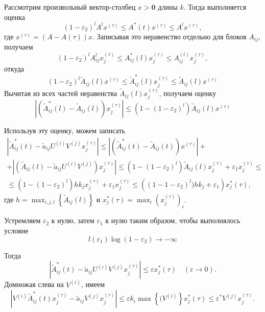\documentclass[12pt]{article}
\renewcommand{\leq}{\leqslant}
\renewcommand{\epsilon}{\varepsilon}
\begin{document}
{Рассмотрим произвольный вектор-столбец $x > \mathbf{0}$ длины $k$. Тогда выполняется оценка
\begin{equation}
	(1 - \epsilon_2)^l A^l x^{(\tau)} \leq A^*(t) x^{(\tau)} \leq A^l x^{(\tau)},
\end{equation}
где $x^{(\tau)} = (A - A(\tau)) x$. Записывая это неравенство отдельно для блоков $A_{ij}$, получаем
\begin{equation}
	(1 - \epsilon_2)^l A_{ij}^l x^{(\tau)}_j \leq A^*_{ij}(l) x^{(\tau)}_j \leq A^{(l)}_{ij} x^{(\tau)}_j,
\end{equation}
откуда
\begin{equation}
	(1 - \epsilon_2)^l \tilde{A}_{ij}(l) x^{(\tau)} \leq \tilde{A}^*_{ij}(l) x^{(\tau)}_j \leq \tilde{A}_{ij}(l) x^{(\tau)}
\end{equation}
Вычитая из всех частей неравенства $\tilde{A}_{ij}(l) x^{(\tau)}_j$, получаем оценку
\begin{equation}
	\left| \left( \tilde{A}^*_{ij}(l) - \tilde{A}_{ij}(l) \right) x^{(\tau)}_j \right| \leq (1 - (1 - \epsilon_2)^l) \tilde{A}_{ij}(l) x^{(\tau)}
\end{equation}

Используя эту оценку, можем записать
\begin{multline}
	\left| \tilde{A}^*_{ij}(t) - \tilde{a}_{ij} U^{(i)} V^{(j)} x^{(\tau)}_j \right| \leq \left| \left( \tilde{A}^*_{ij}(t) - \tilde{A}_{ij}(t) \right) x^{(\tau)} \right| + \\
	+ \left| \left( \tilde{A}_{ij}(l) - \tilde{a}_{ij} U^{(i)} V^{(j)} \right) x^{(\tau)}_j \right| \leq (1 - (1 - \epsilon_2)^l) \tilde{A}_{ij}(l) x^{(\tau)}_j + \epsilon_1 x^{(\tau)}_j \leq \\
	\leq (1 - (1 - \epsilon_2)^l) h k_j x^{(\tau)}_j + \epsilon_1 x^{(\tau)}_j \leq \left( (1 - 1 - \epsilon_2)^l) h k_j + \epsilon_1 \right) x^*_j(\tau),
\end{multline}
где $h = \max_{i,j,l} \left\{ \tilde{A}_{ij}(l) \right\}$ и $x^*_j(\tau) = \max_i (x^{(\tau)}_j)_i$.

Устремляем $\epsilon_2$ к нулю, затем $\epsilon_1$ к нулю таким образом, чтобы выполнялось условие
\begin{equation}
	l(\epsilon_1) \log(1 - \epsilon_2) \rightarrow -\infty
\end{equation}

Тогда 
\begin{equation}
	\left| \tilde{A}^*_{ij}(t) - \tilde{a}_{ij} U^{(i)} V^{(j)} x^{(\tau)}_j \right| \leq \epsilon x^*_j(\tau)\quad (\epsilon \rightarrow 0).
\end{equation}
Домножая слева на $V^{(i)}$, имеем
\begin{equation}
	\left| V^{(i)} \tilde{A}^*_{ij}(t) x^{(\tau)}_j - \tilde{a}_{ij} V^{(j)} x^{(\tau)}_j \right| \leq \epsilon k_i \max \left\{ (V^{(i)} \right\} x^*_j(\tau) \leq \epsilon^* V^{(j)} x^{(\tau)}_j.
\end{equation}

}
\end{document}
